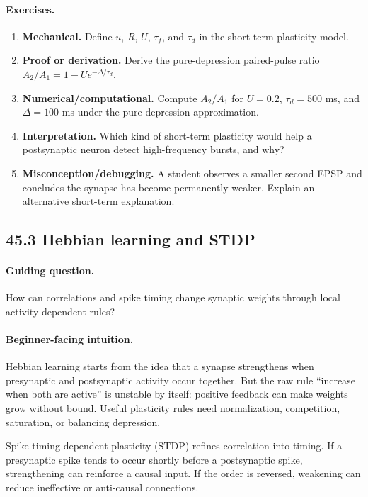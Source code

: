 \paragraph{Exercises.}
\begin{enumerate}[label=\textbf{45.2.\arabic*.}, leftmargin=*]
\item \textbf{Mechanical.} Define \(u\), \(R\), \(U\), \(\tau_f\), and \(\tau_d\) in the short-term plasticity model.
\item \textbf{Proof or derivation.} Derive the pure-depression paired-pulse ratio \(A_2/A_1=1-Ue^{-\Delta/\tau_d}\).
\item \textbf{Numerical/computational.} Compute \(A_2/A_1\) for \(U=0.2\), \(\tau_d=500\) ms, and \(\Delta=100\) ms under the pure-depression approximation.
\item \textbf{Interpretation.} Which kind of short-term plasticity would help a postsynaptic neuron detect high-frequency bursts, and why?
\item \textbf{Misconception/debugging.} A student observes a smaller second EPSP and concludes the synapse has become permanently weaker. Explain an alternative short-term explanation.
\end{enumerate}

\subsection{45.3 Hebbian learning and STDP}

\paragraph{Guiding question.}
How can correlations and spike timing change synaptic weights through local activity-dependent rules?

\paragraph{Beginner-facing intuition.}
Hebbian learning starts from the idea that a synapse strengthens when presynaptic and postsynaptic activity occur together. But the raw rule ``increase when both are active'' is unstable by itself: positive feedback can make weights grow without bound. Useful plasticity rules need normalization, competition, saturation, or balancing depression.

Spike-timing-dependent plasticity (STDP) refines correlation into timing. If a presynaptic spike tends to occur shortly before a postsynaptic spike, strengthening can reinforce a causal input. If the order is reversed, weakening can reduce ineffective or anti-causal connections.

